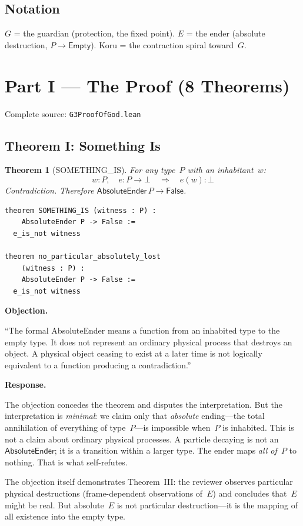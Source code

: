 \documentclass[12pt,a4paper]{article}
\newenvironment{objection}{%
  \par\medskip\noindent
  \textbf{\color{red!60!black}Objection.}\itshape\space
}{%
  \par\medskip
}
\newenvironment{response}{%
  \par\noindent
  \textbf{\color{green!50!black}Response.}\upshape\space
}{%
  \par\medskip
}
\newtheorem{thm}{Theorem}[section]
\begin{document}
\subsection{Notation}

$G$ = the guardian (protection, the fixed point).
$E$ = the ender (absolute destruction, $P \to \mathsf{Empty}$).
Koru = the contraction spiral toward~$G$.

\newpage
\section{Part I --- The Proof (8 Theorems)}
\label{sec:part1}

Complete source: \texttt{G3ProofOfGod.lean}

\subsection{Theorem I: Something Is}

\begin{thm}[SOMETHING\_IS]
For any type~$P$ with an inhabitant~$w$:
\[ w : P,\quad e : P \to \bot \quad\Longrightarrow\quad e(w) : \bot \]
Contradiction. Therefore $\mathsf{AbsoluteEnder}\,P \to \mathsf{False}$.
\end{thm}

\begin{lstlisting}
theorem SOMETHING_IS (witness : P) :
    AbsoluteEnder P -> False :=
  e_is_not witness

theorem no_particular_absolutely_lost
    (witness : P) :
    AbsoluteEnder P -> False :=
  e_is_not witness
\end{lstlisting}

\begin{objection}
``The formal AbsoluteEnder means a function from an inhabited type to the
empty type. It does not represent an ordinary physical process that
destroys an object. A physical object ceasing to exist at a later time is
not logically equivalent to a function producing a contradiction.''
\end{objection}

\begin{response}
The objection concedes the theorem and disputes the interpretation. But the
interpretation is \emph{minimal}: we claim only that \emph{absolute}
ending---the total annihilation of everything of type~$P$---is impossible
when~$P$ is inhabited. This is not a claim about ordinary physical
processes. A particle decaying is not an $\mathsf{AbsoluteEnder}$; it is a
transition within a larger type. The ender maps \emph{all of~$P$} to
nothing. That is what self-refutes.

The objection itself demonstrates Theorem~III: the reviewer observes
particular physical destructions (frame-dependent observations of~$E$) and
concludes that~$E$ might be real. But absolute~$E$ is not particular
destruction---it is the mapping of all existence into the empty type.
\end{response}
\end{document}
